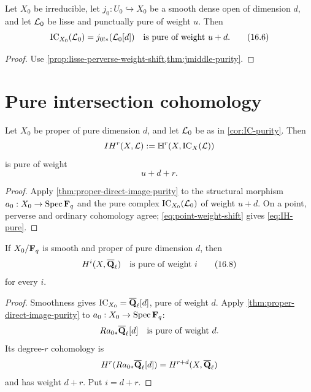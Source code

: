 \begin{corollary}
\label{cor:IC-purity}
Let \(X_0\) be irreducible, let \(j_0:U_0\hookrightarrow X_0\) be a smooth
dense open of dimension \(d\), and let \(\mathcal L_0\) be lisse and punctually pure
of weight \(u\).  Then
\[
  \operatorname{IC}_{X_0}(\mathcal L_0)=j_{0!*}(\mathcal L_0[d])
  \quad\text{is pure of weight }u+d.
\tag{16.6}\label{eq:IC-pure-weight}
\]
\end{corollary}

\begin{proof}
Use \cref{prop:lisse-perverse-weight-shift,thm:jmiddle-purity}.
\end{proof}

\section{Pure intersection cohomology}

\begin{corollary}
\label{cor:proper-IH-purity}
Let \(X_0\) be proper of pure dimension \(d\), and let \(\mathcal L_0\) be as in
\cref{cor:IC-purity}.  Then
\[
  IH^r(X,\mathcal L)
  :=\mathbb H^r(X,\operatorname{IC}_X(\mathcal L))
\]
is pure of weight
\[
  u+d+r.
\tag{16.7}\label{eq:IH-pure}
\]
\end{corollary}

\begin{proof}
Apply \cref{thm:proper-direct-image-purity} to the structural morphism
\(a_0:X_0\to\operatorname{Spec}\mathbf F_q\) and the pure complex
\(\operatorname{IC}_{X_0}(\mathcal L_0)\) of weight \(u+d\).  On a point, perverse and ordinary
cohomology agree; \eqref{eq:point-weight-shift} gives
\eqref{eq:IH-pure}.
\end{proof}

\begin{corollary}
\label{cor:perverse-smooth-proper-purity}
If \(X_0/\mathbf F_q\) is smooth and proper of pure dimension \(d\), then
\[
  H^i(X,\overline{\mathbf Q}_\ell)\quad\text{is pure of weight }i
\tag{16.8}\label{eq:perverse-smooth-purity}
\]
for every \(i\).
\end{corollary}

\begin{proof}
Smoothness gives \(\operatorname{IC}_{X_0}=\overline{\mathbf Q}_\ell[d]\), pure of weight \(d\).  Apply
\cref{thm:proper-direct-image-purity} to \(a_0:X_0\to\operatorname{Spec}\mathbf F_q\):
\[
  Ra_{0*}\overline{\mathbf Q}_\ell[d]\quad\text{is pure of weight }d.
\]
Its degree-\(r\) cohomology is
\[
  H^r(Ra_{0*}\overline{\mathbf Q}_\ell[d])=H^{r+d}(X,\overline{\mathbf Q}_\ell)
\]
and has weight \(d+r\).  Put \(i=d+r\).
\end{proof}

